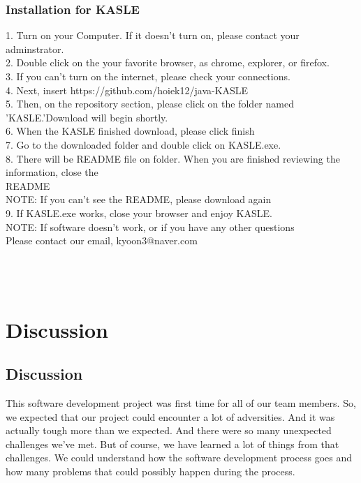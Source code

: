 \documentclass[10pt,journal,compsoc]{IEEEtran}
\begin{document}
\subsubsection{Installation for KASLE}
1. Turn on your Computer. If it doesn't turn on, please contact your adminstrator.\\
2. Double click on the your favorite browser, as chrome, explorer, or firefox.\\ 
3. If you can't turn on the internet, please check your connections.\\
4. Next, insert https://github.com/hoiek12/java-KASLE\\
5. Then, on the repository section, please click on the folder named 'KASLE.'Download will begin shortly.\\
6. When the KASLE finished download, please click finish\\
7. Go to the downloaded folder and double click on KASLE.exe. \\
8. There will be README file on folder. When you are finished reviewing the information, close the\\
README\\
NOTE: If you can't see the README, please download again\\
9. If KASLE.exe works, close your browser and enjoy KASLE.\\
NOTE: If software doesn't work, or if you have any other questions \\
Please contact our email, kyoon3@naver.com\\
\\\\\\
\ifCLASSOPTIONcompsoc
{}
\else
\section{Discussion}
\label{sec:Discussion}
\fi
\subsection{Discussion\\}
This software development project was first time for all of our team members. So, we expected that our project could encounter a lot of adversities. And it was actually tough more than we expected. And there were so many unexpected challenges we’ve met. But of course, we have learned a lot of things from that challenges. We could understand how the software development process goes and how many problems that could possibly happen during the process.
\end{document}
